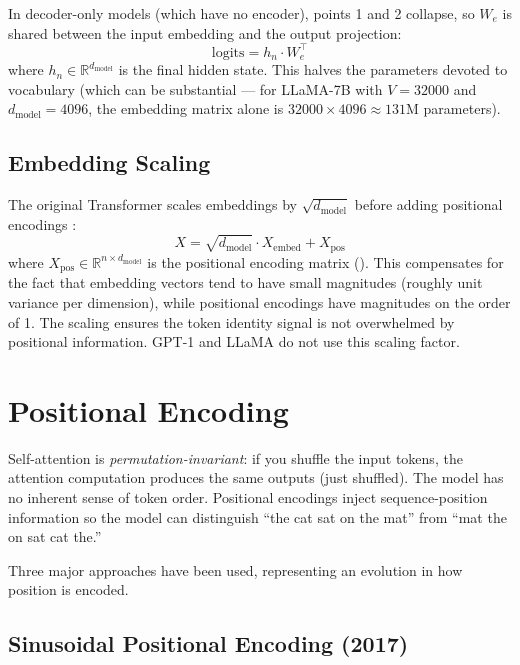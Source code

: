 \documentclass[11pt,a4paper]{article}
\newcommand{\R}{\mathbb{R}}
\newcommand{\dmodel}{d_{\text{model}}}
\begin{document}
In decoder-only models (which have no encoder), points 1 and 2 collapse, so $W_e$ is
shared between the input embedding and the output projection:
\begin{equation}
  \text{logits} = h_n \cdot W_e^\top
\end{equation}
where $h_n \in \R^{\dmodel}$ is the final hidden state. This halves the parameters
devoted to vocabulary (which can be substantial --- for LLaMA-7B with $V = 32000$ and
$\dmodel = 4096$, the embedding matrix alone is $32000 \times 4096 \approx 131$M
parameters).

\subsection{Embedding Scaling}

The original Transformer scales embeddings by $\sqrt{\dmodel}$ before adding positional
encodings \cite{vaswani2017}:
\begin{equation}
  X = \sqrt{\dmodel} \cdot X_{\text{embed}} + X_{\text{pos}}
\end{equation}
where $X_{\text{pos}} \in \R^{n \times \dmodel}$ is the positional encoding matrix
().
This compensates for the fact that embedding vectors tend to have small magnitudes
(roughly unit variance per dimension), while positional encodings have magnitudes on the
order of 1. The scaling ensures the token identity signal is not overwhelmed by positional
information. GPT-1 and LLaMA do not use this scaling factor.


\section{Positional Encoding}
\label{sec:positional-encoding}

Self-attention is \emph{permutation-invariant}: if you shuffle the input tokens,
the attention computation produces the same outputs (just shuffled). The model has no
inherent sense of token order. Positional encodings inject sequence-position information
so the model can distinguish ``the cat sat on the mat'' from ``mat the on sat cat the.''

Three major approaches have been used, representing an evolution in how position is
encoded.

\subsection{Sinusoidal Positional Encoding (2017)}
\end{document}
